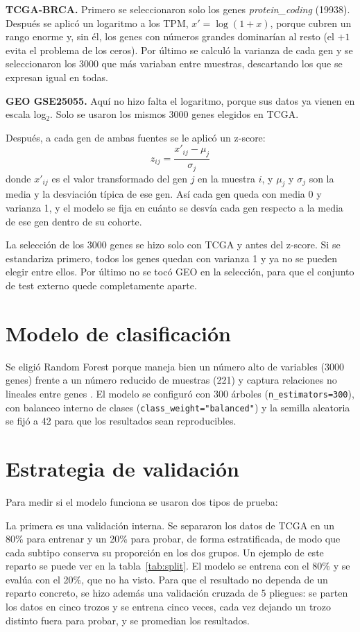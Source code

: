 \documentclass[12pt, a4paper]{report}
\begin{document}
\textbf{TCGA-BRCA.} Primero se seleccionaron solo los genes \textit{protein\_coding} (19938). Después se aplicó un logaritmo a los TPM, $x' = \log(1 + x)$, porque cubren un rango enorme y, sin él, los genes con números grandes dominarían al resto (el $+1$ evita el problema de los ceros). Por último se calculó la varianza de cada gen y se seleccionaron los 3000 que más variaban entre muestras, descartando los que se expresan igual en todas.

\textbf{GEO GSE25055.} Aquí no hizo falta el logaritmo, porque sus datos ya vienen en escala log$_2$. Solo se usaron los mismos 3000 genes elegidos en TCGA.

Después, a cada gen de ambas fuentes se le aplicó un z-score:
\[
z_{ij} = \frac{x'_{ij} - \mu_j}{\sigma_j}
\]
donde $x'_{ij}$ es el valor transformado del gen $j$ en la muestra $i$, y $\mu_j$ y $\sigma_j$ son la media y la desviación típica de ese gen. Así cada gen queda con media 0 y varianza 1, y el modelo se fija en cuánto se desvía cada gen respecto a la media de ese gen dentro de su cohorte.

La selección de los 3000 genes se hizo solo con TCGA y antes del z-score. Si se estandariza primero, todos los genes quedan con varianza 1 y ya no se pueden elegir entre ellos. Por último no se tocó GEO en la selección, para que el conjunto de test externo quede completamente aparte.

\section{Modelo de clasificación}

Se eligió Random Forest porque maneja bien un número alto de variables (3000 genes) frente a un número reducido de muestras (221) y captura relaciones no lineales entre genes \cite{breiman_random_2001}. El modelo se configuró con 300 árboles (\texttt{n\_estimators=300}), con balanceo interno de clases (\texttt{class\_weight="balanced"}) y la semilla aleatoria se fijó a 42 para que los resultados sean reproducibles.

\section{Estrategia de validación}

Para medir si el modelo funciona se usaron dos tipos de prueba:

La primera es una validación interna. Se separaron los datos de TCGA en un 80\% para entrenar y un 20\% para probar, de forma estratificada, de modo que cada subtipo conserva su proporción en los dos grupos. Un ejemplo de este reparto se puede ver en la tabla~\ref{tab:split}. El modelo se entrena con el 80\% y se evalúa con el 20\%, que no ha visto. Para que el resultado no dependa de un reparto concreto, se hizo además una validación cruzada de 5 pliegues: se parten los datos en cinco trozos y se entrena cinco veces, cada vez dejando un trozo distinto fuera para probar, y se promedian los resultados.
\end{document}
